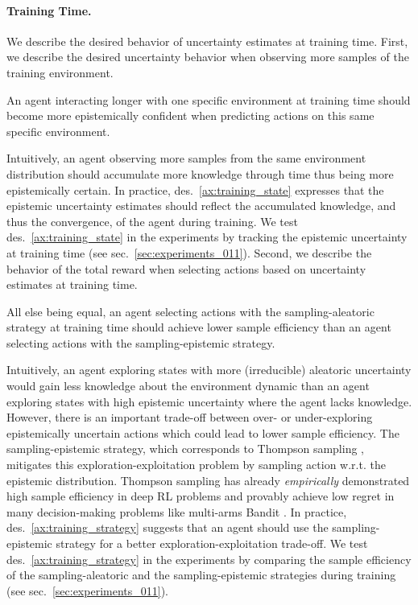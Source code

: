 \paragraph{Training Time.} We describe the desired behavior of uncertainty estimates at training time. First, we describe the desired uncertainty behavior when observing more samples of the training environment.
\begin{desiderata}
    \label{ax:training_state}
    An agent interacting longer with one specific environment at training time should become more epistemically confident when predicting actions on this same specific environment.
\end{desiderata}
\vspace{-2mm}
Intuitively, an agent observing more samples from the same environment distribution should accumulate more knowledge through time thus being more epistemically certain. In practice, des.~\ref{ax:training_state} expresses that the epistemic uncertainty estimates should reflect the accumulated knowledge, and thus the convergence, of the agent during training. We test des.~\ref{ax:training_state} in the experiments by tracking the epistemic uncertainty at training time (see sec.~\ref{sec:experiments_011}). Second, we describe the behavior of the total reward when selecting actions based on uncertainty estimates at training time.
\begin{desiderata}
    \label{ax:training_strategy}
    All else being equal, an agent selecting actions with the sampling-aleatoric strategy at training time should achieve lower sample efficiency than an agent selecting actions with the sampling-epistemic strategy.
\end{desiderata}
Intuitively, an agent exploring states with more (irreducible) aleatoric uncertainty would gain less knowledge about the environment dynamic than an agent exploring states with high epistemic uncertainty where the agent lacks knowledge. However, there is an important trade-off between over- or under-exploring epistemically uncertain actions which could lead to lower sample efficiency. The sampling-epistemic strategy, which corresponds to Thompson sampling \cite{thompson-sampling}, mitigates this exploration-exploitation problem by sampling action w.r.t. the epistemic distribution. Thompson sampling has already \emph{empirically} demonstrated high sample efficiency in deep RL problems \cite{dropout} and provably achieve low regret in many decision-making problems like multi-arms Bandit \cite{thompson-sampling-mab, thompson-sampling-information}. In practice, des.~\ref{ax:training_strategy} suggests that an agent should use the sampling-epistemic strategy for a better exploration-exploitation trade-off. We test des.~\ref{ax:training_strategy} in the experiments by comparing the sample efficiency of the sampling-aleatoric and the sampling-epistemic strategies during training (see sec.~\ref{sec:experiments_011}).

